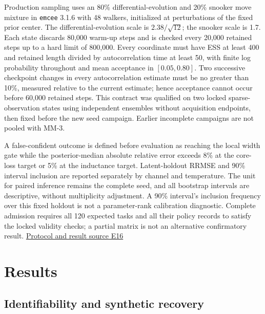 Production sampling uses an 80\% differential-evolution and 20\% snooker
move mixture in \texttt{emcee} 3.1.6 with 48 walkers, initialized at
perturbations of the fixed prior center. The differential-evolution
scale is \(2.38/\sqrt{12}\); the snooker scale is 1.7. Each state
discards 80,000 warm-up steps and is checked every 20,000 retained steps
up to a hard limit of 800,000. Every coordinate must have ESS at least
400 and retained length divided by autocorrelation time at least 50,
with finite log probability throughout and mean acceptance in
\([0.05,0.80]\). Two successive checkpoint changes in every
autocorrelation estimate must be no greater than 10\%, measured relative
to the current estimate; hence acceptance cannot occur before 60,000
retained steps. This contract was qualified on two locked
sparse-observation states using independent ensembles without
acquisition endpoints, then fixed before the new seed campaign. Earlier
incomplete campaigns are not pooled with MM-3.

A false-confident outcome is defined before evaluation as reaching the
local width gate while the posterior-median absolute relative error
exceeds 8\% at the core-loss target or 5\% at the inductance target.
Latent-holdout RRMSE and 90\% interval inclusion are reported separately
by channel and temperature. The unit for paired inference remains the
complete seed, and all bootstrap intervals are descriptive, without
multiplicity adjustment. A 90\% interval's inclusion frequency over this
fixed holdout is not a parameter-rank calibration diagnostic. Complete
admission requires all 120 expected tasks and all their policy records
to satisfy the locked validity checks; a partial matrix is not an
alternative confirmatory result.
\href{https://github.com/hoangduong6210/EIG-bayesian-for-Recover-potential-Physical-Parameter-of-MagComponent/blob/927bbcb6d0b862598fae87d2575a872bbd79b5f1/wiki/evidence/Evidence-Sources.md\#e16}{Protocol
and result source E16}

\hypertarget{results}{%
\section{Results}\label{results}}

\hypertarget{identifiability-and-synthetic-recovery}{%
\subsection{Identifiability and synthetic
recovery}\label{identifiability-and-synthetic-recovery}}

